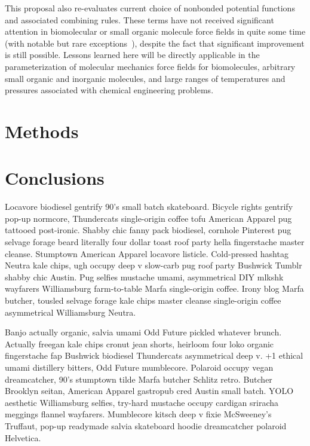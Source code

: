 \documentclass[aps,pre,twocolumn,nofootinbib,superscriptaddress,linenumbers]{revtex4-1}
\begin{document}
This proposal also re-evaluates current choice of nonbonded potential functions and associated combining rules.
These terms have not received significant attention in biomolecular or small organic molecule force fields in quite some time (with notable but rare exceptions~\cite{ponder-case:adv-prot-chem:2003:force-fields-review}), despite the fact that significant improvement is still possible.
Lessons learned here will be directly applicable in the parameterization of molecular mechanics force fields for biomolecules, arbitrary small organic and inorganic molecules, and large ranges of temperatures and pressures associated with chemical engineering problems.




\section{Methods}
\label{section:methods}



\section{Conclusions}

Locavore biodiesel gentrify 90's small batch skateboard. Bicycle rights gentrify pop-up normcore, Thundercats single-origin coffee tofu American Apparel pug tattooed post-ironic. Shabby chic fanny pack biodiesel, cornhole Pinterest pug selvage forage beard literally four dollar toast roof party hella fingerstache master cleanse. Stumptown American Apparel locavore listicle. Cold-pressed hashtag Neutra kale chips, ugh occupy deep v slow-carb pug roof party Bushwick Tumblr shabby chic Austin. Pug selfies mustache umami, asymmetrical DIY mlkshk wayfarers Williamsburg farm-to-table Marfa single-origin coffee. Irony blog Marfa butcher, tousled selvage forage kale chips master cleanse single-origin coffee asymmetrical Williamsburg Neutra.

Banjo actually organic, salvia umami Odd Future pickled whatever brunch. Actually freegan kale chips cronut jean shorts, heirloom four loko organic fingerstache fap Bushwick biodiesel Thundercats asymmetrical deep v. +1 ethical umami distillery bitters, Odd Future mumblecore. Polaroid occupy vegan dreamcatcher, 90's stumptown tilde Marfa butcher Schlitz retro. Butcher Brooklyn seitan, American Apparel gastropub cred Austin small batch. YOLO aesthetic Williamsburg selfies, try-hard mustache occupy cardigan sriracha meggings flannel wayfarers. Mumblecore kitsch deep v fixie McSweeney's Truffaut, pop-up readymade salvia skateboard hoodie dreamcatcher polaroid Helvetica.
\end{document}

